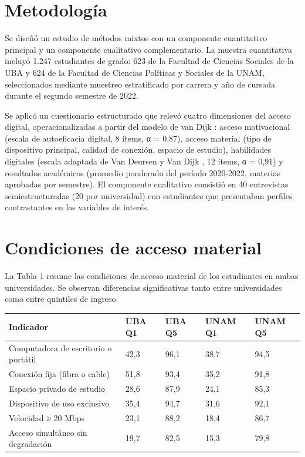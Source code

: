 \documentclass{article}
\begin{document}
\section{Metodología}
Se diseñó un estudio de métodos mixtos con un componente cuantitativo principal y un componente cualitativo complementario. La muestra cuantitativa incluyó 1.247 estudiantes de grado: 623 de la Facultad de Ciencias Sociales de la UBA y 624 de la Facultad de Ciencias Políticas y Sociales de la UNAM, seleccionados mediante muestreo estratificado por carrera y año de cursada durante el segundo semestre de 2022.

Se aplicó un cuestionario estructurado que relevó cuatro dimensiones del acceso digital, operacionalizadas a partir del modelo de van Dijk \autocite*{2565-VANDIJK2020}: acceso motivacional (escala de autoeficacia digital, 8 ítems, α = 0,87), acceso material (tipo de dispositivo principal, calidad de conexión, espacio de estudio), habilidades digitales (escala adaptada de Van Deursen y Van Dijk \autocite*{2564-VANDEURSEN2019}, 12 ítems, α = 0,91) y resultados académicos (promedio ponderado del período 2020-2022, materias aprobadas por semestre). El componente cualitativo consistió en 40 entrevistas semiestructuradas (20 por universidad) con estudiantes que presentaban perfiles contrastantes en las variables de interés.


\section{Condiciones de acceso material}
La Tabla 1 resume las condiciones de acceso material de los estudiantes en ambas universidades. Se observan diferencias significativas tanto entre universidades como entre quintiles de ingreso.


\begin{table}[!ht]
\centering
{\sf\footnotesize\setlength\tabcolsep{4pt}%
  \begin{tabular}{@{}lllll@{}}
    \toprule
    \textbf{\textbf{Indicador}} & \textbf{\textbf{UBA Q1}} & \textbf{\textbf{UBA Q5}} & \textbf{\textbf{UNAM Q1}} & \textbf{\textbf{UNAM Q5}} \\
    \midrule
    Computadora de escritorio o portátil & 42,3 & 96,1 & 38,7 & 94,5 \\
    \midrule
    Conexión fija (fibra o cable) & 51,8 & 93,4 & 35,2 & 91,8 \\
    \midrule
    Espacio privado de estudio & 28,6 & 87,9 & 24,1 & 85,3 \\
    \midrule
    Dispositivo de uso exclusivo & 35,4 & 94,7 & 31,6 & 92,1 \\
    \midrule
    Velocidad ≥ 20 Mbps & 23,1 & 88,2 & 18,4 & 86,7 \\
    \midrule
    Acceso simultáneo sin degradación & 19,7 & 82,5 & 15,3 & 79,8 \\
    \bottomrule
  \end{tabular}
}%
\label{tbl-1}
\end{table}
\end{document}
